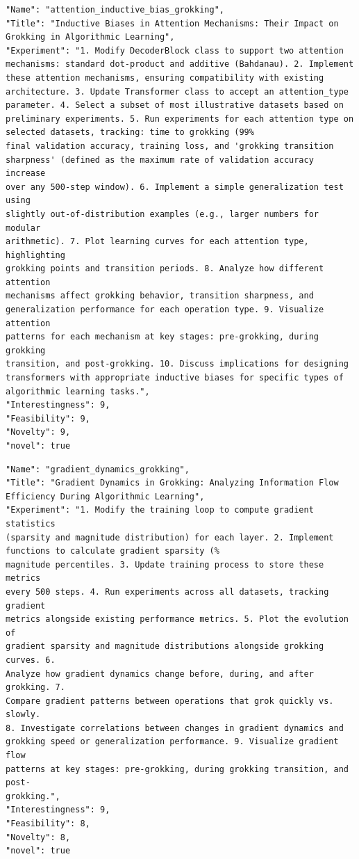 \begin{tcolorbox}[breakable,colback=blue!5!white, colframe=blue!75!black, title=Idea 37/50 - \texttt{attention\_inductive\_bias\_grokking}]
\small
\begin{verbatim}
"Name": "attention_inductive_bias_grokking",
"Title": "Inductive Biases in Attention Mechanisms: Their Impact on
Grokking in Algorithmic Learning",
"Experiment": "1. Modify DecoderBlock class to support two attention
mechanisms: standard dot-product and additive (Bahdanau). 2. Implement
these attention mechanisms, ensuring compatibility with existing
architecture. 3. Update Transformer class to accept an attention_type
parameter. 4. Select a subset of most illustrative datasets based on
preliminary experiments. 5. Run experiments for each attention type on
selected datasets, tracking: time to grokking (99%
final validation accuracy, training loss, and 'grokking transition
sharpness' (defined as the maximum rate of validation accuracy increase
over any 500-step window). 6. Implement a simple generalization test using
slightly out-of-distribution examples (e.g., larger numbers for modular
arithmetic). 7. Plot learning curves for each attention type, highlighting
grokking points and transition periods. 8. Analyze how different attention
mechanisms affect grokking behavior, transition sharpness, and
generalization performance for each operation type. 9. Visualize attention
patterns for each mechanism at key stages: pre-grokking, during grokking
transition, and post-grokking. 10. Discuss implications for designing
transformers with appropriate inductive biases for specific types of
algorithmic learning tasks.",
"Interestingness": 9,
"Feasibility": 9,
"Novelty": 9,
"novel": true
\end{verbatim}
\end{tcolorbox}

\begin{tcolorbox}[breakable,colback=blue!5!white, colframe=blue!75!black, title=Idea 38/50 - \texttt{gradient\_dynamics\_grokking}]
\small
\begin{verbatim}
"Name": "gradient_dynamics_grokking",
"Title": "Gradient Dynamics in Grokking: Analyzing Information Flow
Efficiency During Algorithmic Learning",
"Experiment": "1. Modify the training loop to compute gradient statistics
(sparsity and magnitude distribution) for each layer. 2. Implement
functions to calculate gradient sparsity (%
magnitude percentiles. 3. Update training process to store these metrics
every 500 steps. 4. Run experiments across all datasets, tracking gradient
metrics alongside existing performance metrics. 5. Plot the evolution of
gradient sparsity and magnitude distributions alongside grokking curves. 6.
Analyze how gradient dynamics change before, during, and after grokking. 7.
Compare gradient patterns between operations that grok quickly vs. slowly.
8. Investigate correlations between changes in gradient dynamics and
grokking speed or generalization performance. 9. Visualize gradient flow
patterns at key stages: pre-grokking, during grokking transition, and post-
grokking.",
"Interestingness": 9,
"Feasibility": 8,
"Novelty": 8,
"novel": true
\end{verbatim}
\end{tcolorbox}

